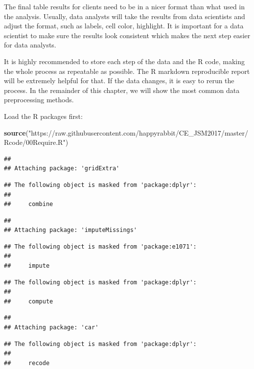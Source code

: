 \documentclass[]{book}
\newenvironment{Shaded}{\begin{snugshade}}{\end{snugshade}}
\newcommand{\KeywordTok}[1]{\textcolor[rgb]{0.13,0.29,0.53}{\textbf{{#1}}}}
\newcommand{\StringTok}[1]{\textcolor[rgb]{0.31,0.60,0.02}{{#1}}}
\newcommand{\NormalTok}[1]{{#1}}
\theoremstyle{definition}
\theoremstyle{definition}
\theoremstyle{remark}
\begin{document}
The final table results for clients need to be in a nicer format than
what used in the analysis. Usually, data analysts will take the results
from data scientists and adjust the format, such as labels, cell color,
highlight. It is important for a data scientist to make sure the results
look consistent which makes the next step easier for data analysts.

It is highly recommended to store each step of the data and the R code,
making the whole process as repeatable as possible. The R markdown
reproducible report will be extremely helpful for that. If the data
changes, it is easy to rerun the process. In the remainder of this
chapter, we will show the most common data preprocessing methods.

Load the R packages first:

\begin{Shaded}
\begin{Highlighting}[]
\KeywordTok{source}\NormalTok{(}\StringTok{"https://raw.githubusercontent.com/happyrabbit/CE_JSM2017/master/Rcode/00Require.R"}\NormalTok{)}
\end{Highlighting}
\end{Shaded}

\begin{verbatim}
## 
## Attaching package: 'gridExtra'
\end{verbatim}

\begin{verbatim}
## The following object is masked from 'package:dplyr':
## 
##     combine
\end{verbatim}

\begin{verbatim}
## 
## Attaching package: 'imputeMissings'
\end{verbatim}

\begin{verbatim}
## The following object is masked from 'package:e1071':
## 
##     impute
\end{verbatim}

\begin{verbatim}
## The following object is masked from 'package:dplyr':
## 
##     compute
\end{verbatim}

\begin{verbatim}
## 
## Attaching package: 'car'
\end{verbatim}

\begin{verbatim}
## The following object is masked from 'package:dplyr':
## 
##     recode
\end{verbatim}
\end{document}
